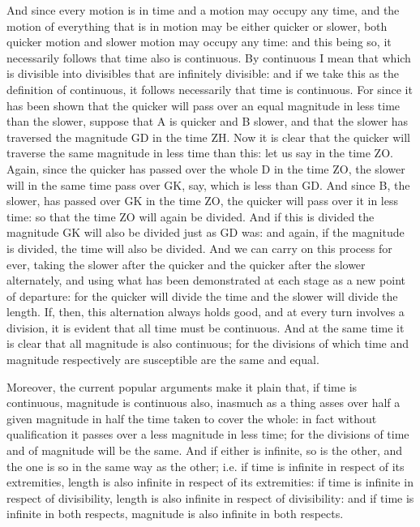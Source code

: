 And since every motion is in time and a motion may occupy any time,
and the motion of everything that is in motion may be either quicker
or slower, both quicker motion and slower motion may occupy any time:
and this being so, it necessarily follows that time also is continuous.
By continuous I mean that which is divisible into divisibles that
are infinitely divisible: and if we take this as the definition of
continuous, it follows necessarily that time is continuous. For since
it has been shown that the quicker will pass over an equal magnitude
in less time than the slower, suppose that A is quicker and B slower,
and that the slower has traversed the magnitude GD in the time ZH.
Now it is clear that the quicker will traverse the same magnitude
in less time than this: let us say in the time ZO. Again, since the
quicker has passed over the whole D in the time ZO, the slower will
in the same time pass over GK, say, which is less than GD. And since
B, the slower, has passed over GK in the time ZO, the quicker will
pass over it in less time: so that the time ZO will again be divided.
And if this is divided the magnitude GK will also be divided just
as GD was: and again, if the magnitude is divided, the time will also
be divided. And we can carry on this process for ever, taking the
slower after the quicker and the quicker after the slower alternately,
and using what has been demonstrated at each stage as a new point
of departure: for the quicker will divide the time and the slower
will divide the length. If, then, this alternation always holds good,
and at every turn involves a division, it is evident that all time
must be continuous. And at the same time it is clear that all magnitude
is also continuous; for the divisions of which time and magnitude
respectively are susceptible are the same and equal. 

Moreover, the current popular arguments make it plain that, if time
is continuous, magnitude is continuous also, inasmuch as a thing asses
over half a given magnitude in half the time taken to cover the whole:
in fact without qualification it passes over a less magnitude in less
time; for the divisions of time and of magnitude will be the same.
And if either is infinite, so is the other, and the one is so in the
same way as the other; i.e. if time is infinite in respect of its
extremities, length is also infinite in respect of its extremities:
if time is infinite in respect of divisibility, length is also infinite
in respect of divisibility: and if time is infinite in both respects,
magnitude is also infinite in both respects. 

